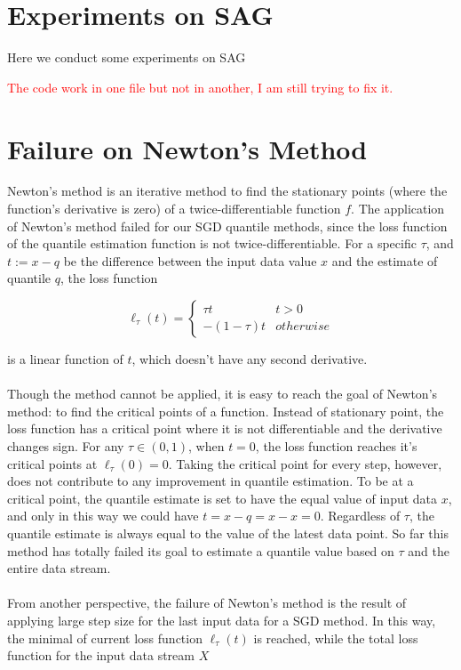 \section{Experiments on SAG}

Here we conduct some experiments on SAG

\textcolor{red}{
The code work in one file but not in another, I am still trying to fix it.}

\section{Failure on Newton's Method}
Newton's method is an iterative method to find the stationary points (where the function's derivative is zero) of a twice-differentiable function $f$. The application of Newton's method failed for our SGD quantile methods, since the loss function of the quantile estimation function is not twice-differentiable. For a specific $\tau$, and $t := x - q$ be the difference between the input data value $x$ and the estimate of quantile $q$, the loss function 

\begin{equation}
    \ell_\tau(t)= 
        \begin{cases}
            \tau t & t > 0\\
            -(1-\tau) t & otherwise
        \end{cases}
\end{equation}


is a linear function of $t$, which doesn't have any second derivative. 
\\\\
Though the method cannot be applied, it is easy to reach the goal of Newton's method: to find the critical points of a function. Instead of stationary point, the loss function has a critical point where it is not differentiable and the derivative changes sign. For any $\tau \in (0,1)$, when $t=0$, the loss function reaches it's critical points at $\ell_\tau(0) = 0$. Taking the critical point for every step, however, does not contribute to any improvement in quantile estimation. To be at a critical point, the quantile estimate is set to have the equal value of input data $x$, and only in this way we could have $t = x-q = x-x = 0$. Regardless of $\tau$, the quantile estimate is always equal to the value of the latest data point. So far this method has totally failed its goal to estimate a quantile value based on $\tau$ and the entire data stream.
\\\\
From another perspective, the failure of Newton's method is the result of applying large step size for the last input data for a SGD method. In this way, the minimal of current loss function $\ell_\tau(t)$ is reached, while the total loss function for the input data stream $X$

